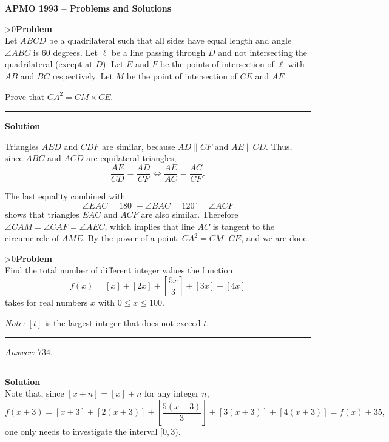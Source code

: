 \documentclass[12pt,oneside,a4paper]{book}
\newcounter{probnum}
\newcounter{solnum}
\newcommand{\prob}{\ifnum\value{probnum}>0\newpage\fi\setcounter{solnum}{0}\stepcounter{probnum}\textbf{Problem \theprobnum}\\}
\newcommand{\ans}{\medskip\hrule\medbreak\emph{Answer: }}
\newcommand{\sol}{\medskip\hrule\medbreak\textbf{Solution}\\}
\begin{document}
\begin{center}
\textbf{\large APMO 1993 -- Problems and Solutions}
\end{center}

\prob Let $ABCD$ be a quadrilateral such that all sides have equal length and angle $\angle ABC$ is 60 degrees.  Let $\ell$ be a line passing through $D$ and not intersecting the quadrilateral (except at $D$). Let $E$ and $F$ be the points of intersection of $\ell$ with $AB$ and $BC$ respectively. Let $M$ be the point of intersection of $CE$ and $AF$.

Prove that $CA^2=CM\times CE$.

\sol
\begin{center}
\end{center}

Triangles $AED$ and $CDF$ are similar, because $AD\parallel CF$ and $AE\parallel CD$. Thus, since $ABC$ and $ACD$ are equilateral triangles,
\[\frac{AE}{CD} = \frac{AD}{CF}\iff \frac{AE}{AC} = \frac{AC}{CF}.\]

The last equality combined with
\[\angle EAC = 180^\circ - \angle BAC = 120^\circ = \angle ACF\]
shows that triangles $EAC$ and $ACF$ are also similar. Therefore $\angle CAM = \angle CAF = \angle AEC$, which implies that line $AC$ is tangent to the circumcircle of $AME$. By the power of a point, $CA^2 = CM\cdot CE$, and we are done.

\prob Find the total number of different integer values the function
\[f(x)=[x]+[2x]+\left[\frac{5x}3\right]+[3x]+[4x]\]
takes for real numbers $x$ with $0\le x\le 100$.

\emph{Note:} $[t]$ is the largest integer that does not exceed $t$.

\ans $734$.

\sol
Note that, since $[x+n] = [x]+n$ for any integer $n$,
\[f(x+3) = [x+3] + [2(x+3)] + \left[\frac{5(x+3)}3\right] + [3(x+3)] + [4(x+3)] = f(x) + 35,\]
one only needs to investigate the interval $[0,3)$.
\end{document}
